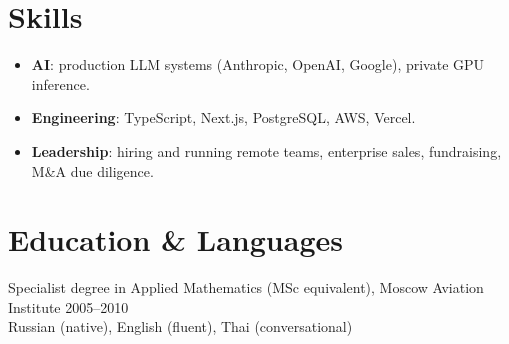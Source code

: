 \documentclass[11pt,a4paper]{article}
\begin{document}
\section*{Skills}
\begin{itemize}
    \item \textbf{AI}: production LLM systems (Anthropic, OpenAI, Google), private GPU inference.
    \item \textbf{Engineering}: TypeScript, Next.js, PostgreSQL, AWS, Vercel.
    \item \textbf{Leadership}: hiring and running remote teams, enterprise sales, fundraising, M\&A due diligence.
\end{itemize}

\section*{Education \& Languages}
Specialist degree in Applied Mathematics (MSc equivalent), Moscow Aviation Institute \hfill 2005--2010 \\[0.3em]
Russian (native), English (fluent), Thai (conversational)
\end{document}
